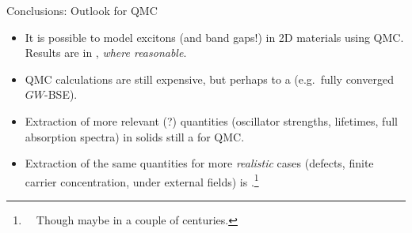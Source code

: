 \documentclass[10pt, pdf, hyperref={draft}, usenames, dvipsnames]{beamer}
\newcommand{\red}[1]{{\bf\color{LancsRed}{#1}}}
\newcommand{\blue}[1]{{\bf\color{NavyBlue}{#1}}}
\newcommand{\green}[1]{{\bf\color{ForestGreen}{#1}}}
\begin{document}
\begin{frame}{Conclusions: Outlook for QMC}
  \begin{itemize}
    \item It is possible to model excitons (and band gaps!) in 2D materials
    using QMC. Results are in \green{agreement with experiment}, \textit{where
    reasonable}.

    \item QMC calculations are still expensive, but perhaps to a \blue{similar degree
    to alternatives} (e.g.~fully converged $GW$-BSE).

    \item Extraction of more relevant (?) quantities (oscillator strengths,
    lifetimes, full absorption spectra) in solids still a \red{pipe dream}
    for QMC.

    \item Extraction of the same quantities for more \textit{realistic} cases
    (defects, finite carrier concentration, under external fields) is
    \green{perfectly possible}.\footnote{~~Though maybe in a couple of
    centuries.}

  \end{itemize}
\end{frame}

\end{document}
